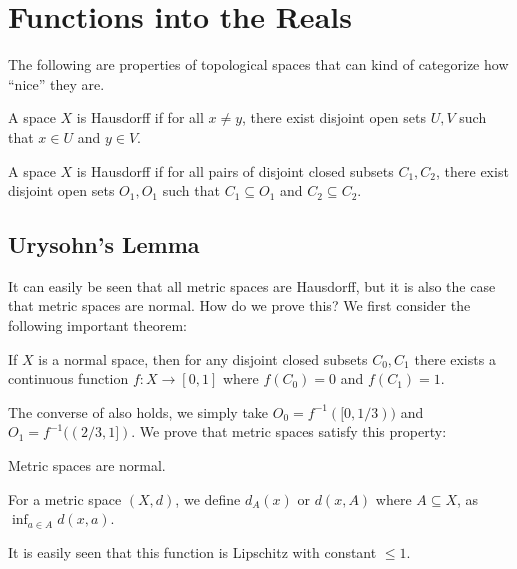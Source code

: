 \chapter{Functions into the Reals}

The following are properties of topological spaces that can kind of categorize how ``nice'' they are.

\begin{definition}[Hausdorff ($T_2$)]
    A space $X$ is Hausdorff if for all $x \ne y$, there exist disjoint open sets $U, V$ such that $x \in U$ and $y \in V$.
\end{definition}

\begin{definition}[Normal ($T_4$)]
    A space $X$ is Hausdorff if for all pairs of disjoint closed subsets $C_1, C_2$, there exist disjoint open sets $O_1, O_1$ such that $C_1 \subseteq O_1$ and $C_2 \subseteq C_2$.
\end{definition}

\section{Urysohn's Lemma}

It can easily be seen that all metric spaces are Hausdorff, but it is also the case that metric spaces are normal. How do we prove this? We first consider the following important theorem:

\begin{theorem}
    \label{thm:urysohnlemma}
    If $X$ is a normal space, then for any disjoint closed subsets $C_0, C_1$ there exists a continuous function $f\colon X \to [0, 1]$ where $f(C_0) = 0$ and $f(C_1) = 1$.
\end{theorem}

The converse of  also holds, we simply take $O_0 = f^{-1}([0, 1/3))$ and $O_1 = f^{-1}((2/3, 1])$. We prove that metric spaces satisfy this property:

\begin{proposition}
    \label{prop:metricnormal}
    Metric spaces are normal.
\end{proposition}

\begin{definition}
    For a metric space $(X, d)$, we define $d_A(x)$ or $d(x, A)$ where $A \subseteq X$, as $\inf_{a \in A} d(x, a)$.
\end{definition}

It is easily seen that this function is Lipschitz with constant $\le 1$.

